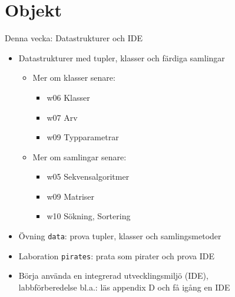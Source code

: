 \documentclass{lecturenotes}
\renewcommand{\vecka}{4}
\newcommand{\veckotema}{Objekt}
\begin{document}
\frame{\titlepage}
\setnextsection{\vecka}
\section[Vecka \vecka: \veckotema]{\veckotema}
\frame{\tableofcontents}

\ifkompendium\else
\begin{Slide}{Denna vecka: Datastrukturer och IDE}
\begin{itemize}
\item Datastrukturer med tupler, klasser och färdiga samlingar
\begin{itemize}
\item Mer om klasser senare:
\begin{itemize}
\item w06 Klasser \item w07 Arv \item w09 Typparametrar
\end{itemize}

\item Mer om samlingar senare:
\begin{itemize}
\item w05 Sekvensalgoritmer \item w09 Matriser \item w10 Sökning, Sortering
\end{itemize}
\end{itemize}

\item Övning \texttt{data}: prova tupler, klasser och samlingsmetoder

\item Laboration \texttt{pirates}: prata som pirater och prova IDE

\item Börja använda en integrerad utvecklingsmiljö (IDE),\\labbförberedelse bl.a.: läs appendix D och få igång en IDE

\end{itemize}
\end{Slide}
\fi


\end{document}
